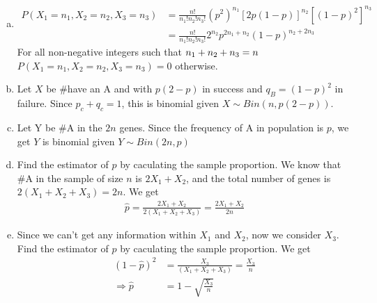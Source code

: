 \documentclass[10.5pt]{article}
\begin{document}
\begin{enumerate}[(a)]
	\item \begin{align*}
		P(X_1=n_1, X_2=n_2, X_3=n_3)
		&=\frac{n!}{n_1!n_2!n_3!}(p^2)^{n_1}\left[2p(1-p)\right]^{n_2}\left[(1-p)^2\right]^{n_3}\\[8pt]
		&=\frac{n!}{n_1!n_2!n_3!}2^{n_2}p^{2n_1+n_2}(1-p)^{n_2+2n_3}
	\end{align*}
	For all non-negative integers such that $n_1+n_2+n_3 = n\\$ $P(X_1=n_1, X_2=n_2, X_3=n_3)=0$ otherwise.\vspace{0.5cm}
	\item Let $X$ be \#have an A and with $p(2-p)$ in success and $q_{B}=(1-p)^2$ in failure.
	Since $p_c+q_c=1$, this is binomial given $X\sim Bin(n, p(2-p))$.\vspace{0.5cm}
	\item Let Y be \#A in the $2n$ genes. Since the frequency of A in population is $p$, we get $Y$ is binomial given $Y\sim Bin(2n, p)$\vspace{0.5cm}
	\item Find the estimator of $p$ by caculating the sample proportion. We know that \#A in the sample of size $n$ is $2X_1+X_2$, and the total number of genes is $2(X_1+X_2+X_3)=2n$.
	We get \begin{align*}
		\hat{p} =\frac{2X_1+X_2}{2(X_1+X_2+X_3)} =\frac{2X_1+X_2}{2n}
	\end{align*}\vspace{0.5cm}
	\item Since we can't get any information within $X_1$ and $X_2$, now we consider $X_3$. Find the estimator of $p$ by caculating the sample proportion.
	We get \begin{align*}
	(1-\hat{p})^2 &=\frac{X_3}{(X_1+X_2+X_3)} =\frac{X_3}{n}\\[8pt]
	\Rightarrow\hat{p} &= 1-\sqrt{\frac{X_3}{n}}
	\end{align*}
\end{enumerate}
\pagebreak
\end{document}
